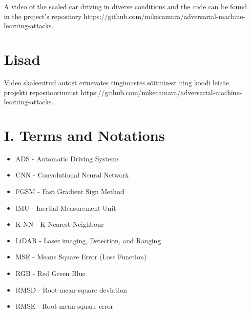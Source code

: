 \documentclass[12pt]{article}
\begin{document}
  A video of the scaled car driving in diverse conditions and the code can be found in the project's  repository https://github.com/mikecamara/adversarial-machine-learning-attacks.

  {\section*{Lisad}
  }

Video skaleeritud autost erinevates tingimustes sõitmisest ning  koodi leiate projekti repositooriumist https://github.com/mikecamara/adversarial-machine-learning-attacks.

\section*{I. Terms and Notations}

\begin{itemize}
    \item ADS - Automatic Driving Systems  
    \item CNN - Convolutional Neural Network 
    \item FGSM - Fast Gradient Sign Method
    \item IMU - Inertial Measurement Unit
    \item K-NN - K Nearest Neighbour
    \item LiDAR - Laser imaging, Detection, and Ranging 
     \item MSE - Means Square Error (Loss Function)
    \item RGB - Red Green Blue
    \item RMSD - Root-mean-square deviation
    \item RMSE - Root-mean-square error
\end{itemize}


\newpage
\end{document}
